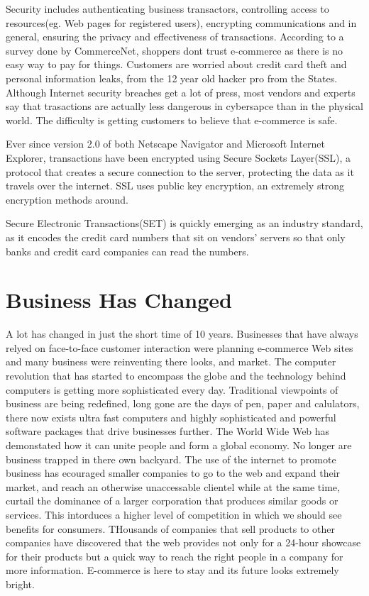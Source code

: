 \documentclass{article}      %
\begin{document}
Security includes authenticating business transactors, controlling access to resources(eg. Web pages for 
registered users), encrypting communications and in general, ensuring the privacy and effectiveness of transactions.
According to a survey done by CommerceNet, shoppers dont trust e-commerce as there is no easy way to pay for
things. Customers are worried about credit card theft and personal information leaks, from the 12 year old hacker
pro from the States\cite{Builder:url}.
Although Internet security breaches get a lot of press, most vendors and experts say that trasactions are actually
less dangerous in cybersapce than in the physical world.  The difficulty is getting customers to believe that
e-commerce is safe.

Ever since version 2.0 of both Netscape Navigator and Microsoft Internet Explorer, transactions have been 
encrypted using Secure Sockets Layer(SSL), a protocol that creates a secure connection to the server, protecting
the data as it travels over the internet.  SSL uses public key encryption, an extremely strong encryption methods
around\cite{Builder:url}.

Secure Electronic Transactions(SET) is quickly emerging as an industry standard, as it encodes the credit card
numbers that sit on vendors' servers so that only banks and credit card companies can read the numbers\cite{Builder:url}.

\section{ Business Has Changed}

A lot has changed in just the short time of 10 years.  Businesses that have always relyed on face-to-face customer
interaction were planning e-commerce Web sites and many business were reinventing there looks, and market.
The computer revolution that has started to encompass the globe and the technology behind computers is getting more 
sophisticated every day.  Traditional viewpoints of 
business are being redefined, long gone are the days of pen, paper and calulators, there now exists ultra fast computers
and highly sophisticated and powerful software packages that drive businesses further.  The World Wide Web has demonstated
how it can unite people and form a global economy. No longer are business trapped in there own backyard.
The use of the internet to promote business has ecouraged smaller companies to go to the web and expand their market, and
reach an otherwise unaccessable clientel
while at the same time, curtail the dominance of a larger corporation that produces similar goods or services.
This intorduces a higher level of competition in which we should see benefits for consumers.  THousands of companies
that sell products to other companies have discovered that the web provides not only for a 24-hour showcase for their
products but a quick way to reach the right people in a company for more information.  
E-commerce is here to stay and its future looks extremely bright.  





\end{document}
